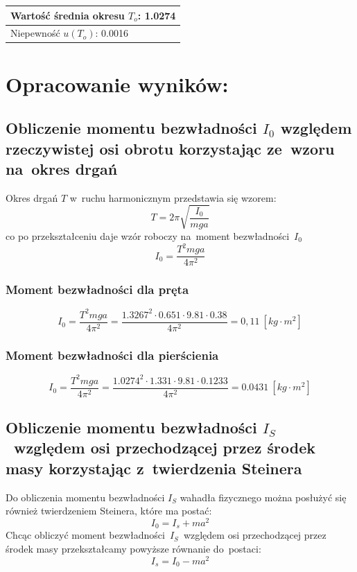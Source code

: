 \documentclass{fizraport}
\begin{document}
\begin{table}[th]
\begin{tabular}{|r|c|c|c|}
\multicolumn{4}{|l|}{Wartość średnia okresu $T_o$:   1.0274} \\ \hline
\multicolumn{4}{|l|}{Niepewność $u(T_o)$:  0.0016 } \\ \hline
\end{tabular}
 \label{tab:pomiarOkres}
\end{table}

\pagebreak
\section{Opracowanie wyników:}
\subsection{Obliczenie momentu bezwładności $I_0$ względem rzeczywistej osi obrotu korzystając ze~wzoru na~okres
drgań}
Okres drgań $T$ w~ruchu harmonicznym przedstawia się wzorem:
\begin{equation*}
T = 2\pi\sqrt{\frac{I_0}{mga}}
\end{equation*}
co po przekształceniu daje wzór roboczy na~moment bezwładności~$I_0$
\begin{equation*}
I_0 = \frac{T^2mga}{4\pi^2}
\end{equation*}
\subsubsection{Moment bezwładności dla pręta}
\begin{equation*}
I_0 = \frac{T^2mga}{4\pi^2}=\frac{1.3267^2\cdot0.651\cdot9.81\cdot0.38}{4\pi ^2}=0,11~\left[kg\cdot m^2\right]
\end{equation*}
\subsubsection{Moment bezwładności dla pierścienia}
\begin{equation*}
I_0 = \frac{T^2mga}{4\pi^2}=\frac{1.0274^2\cdot1.331\cdot9.81\cdot0.1233}{4\pi ^2}=0.0431~\left[kg\cdot m^2\right]%
\end{equation*}

\subsection{Obliczenie momentu bezwładności $I_S$~względem osi przechodzącej
przez środek masy korzystając z~twierdzenia Steinera}
Do obliczenia momentu bezwładności $I_S$ wahadła fizycznego można posłużyć się również twierdzeniem Steinera, które ma postać:
\begin{equation*}
I_0 = I_s + ma^2
\end{equation*}
Chcąc obliczyć moment bezwładności~$I_S$~względem osi przechodzącej przez środek masy przekształcamy powyższe równanie do~postaci:
\begin{equation*}
I_s = I_0 - ma^2
\end{equation*}
\end{document}
